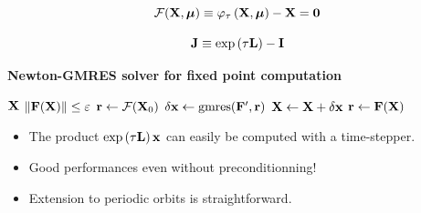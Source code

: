 \documentclass[aspectratio=169, usenames, dvipsnames]{beamer}
\newcommand{\allzeros}{\ensuremath{\mathbf{0}}}
\begin{document}
\begin{frame}
  \vfill

  {
    \Large
    \[
      \mathcal{F}(\vb{X}, \boldsymbol{\mu}) \equiv \varphi_{\tau}\left( \vb{X}, \boldsymbol{\mu} \right) - \vb{X} = \allzeros
    \]
  }
  
  \vfill
\end{frame}

\begin{frame}
  \vfill

  {
    \Large
    \[
      \vb{J} \equiv \exp \left( \tau \vb{L} \right) - \vb{I}
    \]
  }
  \vfill
\end{frame}

\begin{frame}
  \vfill
  \centering
  \textbf{Newton-GMRES solver for fixed point computation}

  \vfill
  
  \begin{minipage}{.48\textwidth}
    \begin{algorithmic}
      \Require $\vb{X}$
      \Ensure $\norm{\vb{F}(\vb{X})} \leq \varepsilon$
      \State $\vb{r} \gets \mathcal{F}(\vb{X}_0)$
      \State $\delta\vb{x} \gets \mathrm{gmres}(\vb{F}^{\prime}, \vb{r})$
      \State $\vb{X} \gets \vb{X} + \delta\vb{x}$
      \State $\vb{r} \gets \vb{F}(\vb{X})$
      \EndWhile
    \end{algorithmic}
  \end{minipage}%
  \hfill%
  \vrule%
  \hfill
  \begin{minipage}{.48\textwidth}
    \begin{itemize}
    \item The product $\exp\left( \tau \vb{L} \right) \vb{x}$ can easily be computed with a time-stepper.

      \bigskip

    \item Good performances even without preconditionning!

      \bigskip

    \item Extension to periodic orbits is straightforward.
    \end{itemize}
  \end{minipage}
  \vfill
\end{frame}
\end{document}
